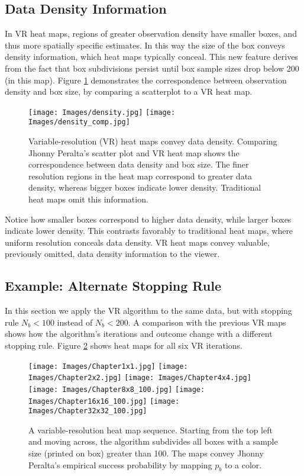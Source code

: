 \subsection{Data Density Information}

In VR heat maps, regions of greater observation density have smaller boxes, and thus more spatially specific estimates. In this way the size of the box conveys density information, which heat maps typically conceal. This new feature derives from the fact that box subdivisions persist until box sample sizes drop below 200 (in this map). Figure \ref{fig:density} demonstrates the correspondence between observation density and box size, by comparing a scatterplot to a VR heat map. 
        \begin{figure}[H]
      	\centering
      	\texttt{[image: Images/density.jpg]}
      	\texttt{[image: Images/density\_comp.jpg]} 
      	\caption{Variable-resolution (VR) heat maps convey data density. Comparing Jhonny Peralta's scatter plot and VR heat map shows the correspondence between data density and box size. The finer resolution regions in the heat map correspond to greater data density, whereas bigger boxes indicate lower density. Traditional heat maps omit this information.}
      	\label{fig:density}
      	\end{figure}
Notice how smaller boxes correspond to higher data density, while larger boxes indicate lower density. This contrasts favorably to traditional heat maps, where uniform resolution conceals data density. VR heat maps convey valuable, previously omitted, data density information to the viewer. 
      	
\subsection{Example: Alternate Stopping Rule} %
      	
In this section we apply the VR algorithm to the same data, but with stopping rule $N_{b} < 100$ instead of $N_{b} < 200$. A comparison with the previous VR maps shows how the algorithm's iterations and outcome change with a different stopping rule. Figure \ref{fig:altsr} shows heat maps for all six VR iterations.
        \begin{figure}[H]
      	\centering
      	\texttt{[image: Images/Chapter1x1.jpg]}
      	\texttt{[image: Images/Chapter2x2.jpg]}
      	\texttt{[image: Images/Chapter4x4.jpg]}
      	\texttt{[image: Images/Chapter8x8\_100.jpg]}
      	\texttt{[image: Images/Chapter16x16\_100.jpg]}
      	\texttt{[image: Images/Chapter32x32\_100.jpg]}
      	\caption{A variable-resolution heat map sequence. Starting from the top left and moving across, the algorithm subdivides all boxes with a sample size (printed on box) greater than 100. The maps convey Jhonny Peralta's empirical success probability by mapping $p_{b}$ to a color.}
      	\label{fig:altsr}
\end{figure} 	

